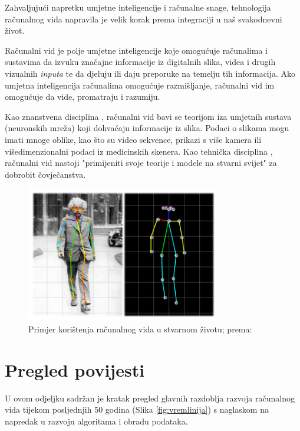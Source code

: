 \documentclass[]{foi} %
\begin{document}
Zahvaljujući napretku umjetne inteligencije i računalne snage, tehnologija računalnog vida napravila je velik korak prema integraciji u naš svakodnevni život.

Računalni vid je polje umjetne inteligencije \cite{wikipedia} koje omogućuje računalima i sustavima da izvuku značajne informacije iz digitalnih slika, videa i drugih vizualnih \textit{inputa} te da djeluju ili daju preporuke na temelju tih informacija. Ako umjetna inteligencija računalima omogućuje razmišljanje, računalni vid im omogućuje da vide, promatraju i razumiju.

Kao znanstvena disciplina \cite{wikipedia}, računalni vid bavi se teorijom iza umjetnih sustava (neuronskih mreža) koji dohvaćaju informacije iz slika. Podaci o slikama mogu imati mnoge oblike, kao što su video sekvence, prikazi s više kamera ili višedimenzionalni podaci iz medicinskih skenera.
Kao tehnička disciplina \cite{wikipedia}, računalni vid nastoji "primijeniti svoje teorije i modele na stvarni svijet" za dobrobit čovječanstva.

\vspace{10mm}
\begin{figure}[!ht]
    \centering
    \includegraphics[width=0.75\textwidth]{slike/einstein.png}
    \caption{Primjer korištenja računalnog vida u stvarnom životu; prema: \cite{szeliskicvaa}}
    \label{fig:einstein}
\end{figure}

\newpage
\section{Pregled povijesti}

U ovom odjeljku sadržan je kratak pregled glavnih razdoblja razvoja računalnog vida tijekom posljednjih 50 godina (Slika \ref{fig:vremlinija}) s naglaskom na napredak u razvoju algoritama i obradu podataka.
\end{document}
